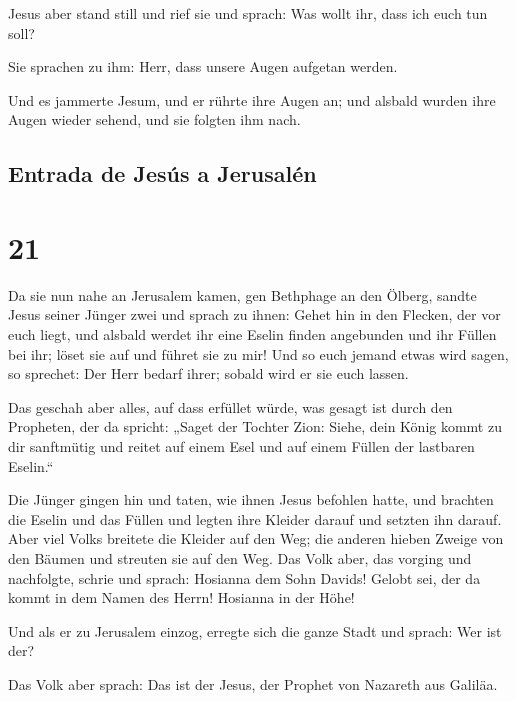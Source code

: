  Jesus aber stand still und rief sie und sprach: Was
wollt ihr, dass ich euch tun soll?

 Sie sprachen zu ihm: Herr, dass unsere Augen aufgetan
werden.

 Und es jammerte Jesum, und er rührte ihre Augen an; und
alsbald wurden ihre Augen wieder sehend, und sie folgten ihm nach.

\hypertarget{entrada-de-jesuxfas-a-jerusaluxe9n}{%
\subsection{Entrada de Jesús a
Jerusalén}\label{entrada-de-jesuxfas-a-jerusaluxe9n}}

\hypertarget{section-20}{%
\section{21}\label{section-20}}

 Da sie nun nahe an Jerusalem kamen, gen Bethphage an den
Ölberg, sandte Jesus seiner Jünger zwei  und sprach zu
ihnen: Gehet hin in den Flecken, der vor euch liegt, und alsbald werdet
ihr eine Eselin finden angebunden und ihr Füllen bei ihr; löset sie auf
und führet sie zu mir!  Und so euch jemand etwas wird
sagen, so sprechet: Der Herr bedarf ihrer; sobald wird er sie euch
lassen.

 Das geschah aber alles, auf dass erfüllet würde, was
gesagt ist durch den Propheten, der da spricht:  „Saget
der Tochter Zion: Siehe, dein König kommt zu dir sanftmütig und reitet
auf einem Esel und auf einem Füllen der lastbaren Eselin.``

 Die Jünger gingen hin und taten, wie ihnen Jesus befohlen
hatte,  und brachten die Eselin und das Füllen und legten
ihre Kleider darauf und setzten ihn darauf.  Aber viel
Volks breitete die Kleider auf den Weg; die anderen hieben Zweige von
den Bäumen und streuten sie auf den Weg.  Das Volk aber,
das vorging und nachfolgte, schrie und sprach: Hosianna dem Sohn Davids!
Gelobt sei, der da kommt in dem Namen des Herrn! Hosianna in der Höhe!

 Und als er zu Jerusalem einzog, erregte sich die ganze
Stadt und sprach: Wer ist der?

 Das Volk aber sprach: Das ist der Jesus, der Prophet von
Nazareth aus Galiläa.

